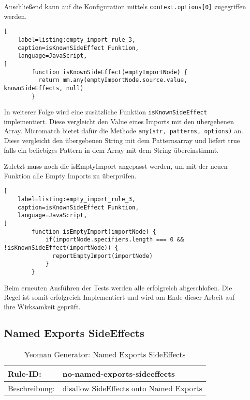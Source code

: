 Anschließend kann auf die Konfiguration mittels \lstinline{context.options[0]} zugegriffen werden.

\begin{lstlisting}[
    label=listing:empty_import_rule_3,
	caption=isKnownSideEffect Funktion,
	language=JavaScript,
]
        function isKnownSideEffect(emptyImportNode) {
          return mm.any(emptyImportNode.source.value, knownSideEffects, null)
        }
\end{lstlisting}

In weiterer Folge wird eine zusätzliche Funktion \lstinline{isKnownSideEffect} implementiert. Diese vergleicht den Value eines Imports mit den übergebenen Array. Micromatch bietet dafür die Methode \lstinline{any(str, patterns, options)} an. Diese vergleicht den übergebenen String mit dem Patternsarray und liefert true falls ein beliebiges Pattern in dem Array mit dem String übereinstimmt.

Zuletzt muss noch die isEmptyImport angepasst werden, um mit der neuen Funktion alle Empty Imports zu überprüfen.

\begin{lstlisting}[
    label=listing:empty_import_rule_3,
	caption=isKnownSideEffect Funktion,
	language=JavaScript,
]
        function isEmptyImport(importNode) {
            if(importNode.specifiers.length === 0 && !isKnownSideEffect(importNode)) {
              reportEmptyImport(importNode)
            }
        }
\end{lstlisting}

Beim erneuten Ausführen der Tests werden alle erfolgreich abgeschloßen. Die Regel ist somit erfolgreich Implementiert und wird am Ende dieser Arbeit auf ihre Wirksamkeit geprüft.

\subsection{Named Exports SideEffects}

\begin{table}[h]
\centering
\caption{Yeoman Generator: Named Exports SideEffects}
\label{tbl:empty_imports}
\begin{tabular}{|l|l|}
\hline
Rule-ID: & no-named-exports-sideeffects \\ \hline
Beschreibung: & disallow SideEffects onto Named Exports \\ \hline
\end{tabular}
\end{table}

